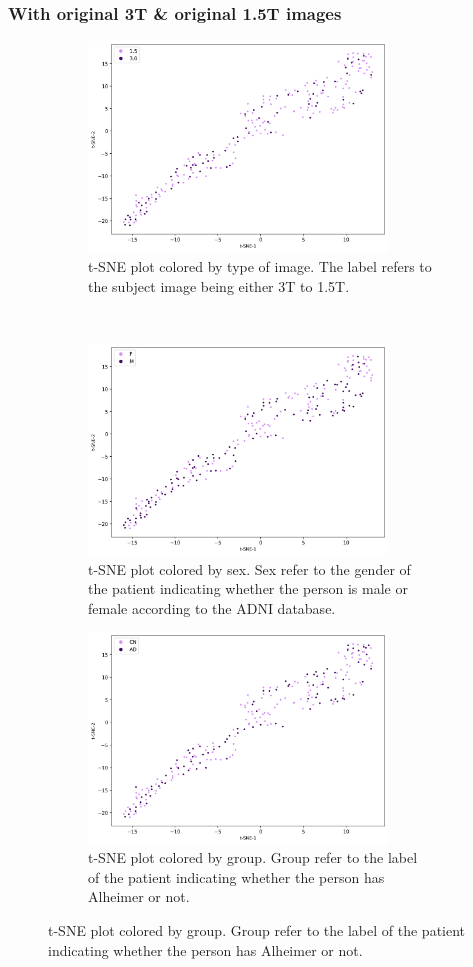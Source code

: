 \documentclass[12pt, fleqn, titlepage]{article}
\newcommand{\1}[1]{\mathds{1}\left[#1\right]}
\begin{document}
\subsubsection{With original 3T \& original 1.5T images }

\begin{figure}[H]
	\centering
	\begin{subfigure}[t]{0.59\textwidth}
		\centering
		\includegraphics[height=2.2in]{imgs/classifier/not_generated_imgs_tsne_type}%
		\caption{t-SNE plot colored by type of image. The label refers to the subject image being either 3T to 1.5T.}
	\end{subfigure}%
	~
	\begin{subfigure}[t]{0.5\textwidth}
		\centering
		\includegraphics[height=2.2in]{imgs/classifier/not_generated_imgs_tsne_sex}%
		\caption{t-SNE plot colored by sex. Sex refer to the gender of the patient indicating whether the person is male or female according to the ADNI database.}	
	\end{subfigure}
	\begin{subfigure}[t]{0.5\textwidth}
		\centering
		\includegraphics[height=2.2in]{imgs/classifier/not_generated_imgs_tsne_group}%
		\caption{t-SNE plot colored by group. Group refer to the label of the patient indicating whether the person has Alheimer or not.}
	\end{subfigure}


\end{figure}
\end{document}
